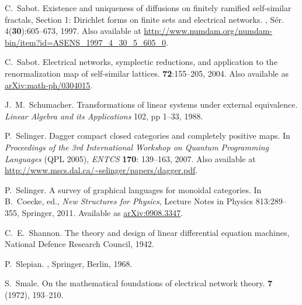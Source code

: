 \begin{thebibliography}{RSW00}
    C.\ Sabot.
    \newblock Existence and uniqueness of diffusions on
    finitely ramified self-similar fractals, Section 1: Dirichlet forms on
    finite sets and electrical networks.
    , S\'er. 4({\bf 30}):605--673, 1997.
    \newblock Also available at
    \href{http://www.numdam.org/numdam-bin/item?id=ASENS_1997_4_30_5_605_0}{http://www.numdam.org/numdam-bin/item?id=ASENS\_1997\_4\_30\_5\_605\_0}.

    C.\ Sabot.
    \newblock Electrical networks, symplectic reductions, and
    application to the renormalization map of self-similar lattices.
     {\bf 72}:155--205, 2004.
    \newblock Also available as
    \href{http://arxiv.org/abs/math-ph/0304015}{arXiv:math-ph/0304015}.

    J.\ M.\ Schumacher.
    \newblock Transformations of linear systems under
    external equivalence.
    \newblock \emph{Linear Algebra and its Applications} 102,
    pp 1--33, 1988.


    P.\ Selinger.
    \newblock Dagger compact closed categories and completely
    positive maps.
    \newblock In {\sl Proceedings of the 3rd International Workshop on
    Quantum Programming Languages} (QPL 2005), {\sl ENTCS} {\bf 170}:
    139--163, 2007.
    \newblock Also available at
    \href{http://www.mscs.dal.ca/~selinger/papers/dagger.pdf}{http://www.mscs.dal.ca/\~{}selinger/papers/dagger.pdf}.

    P.\ Selinger.
    \newblock A survey of graphical languages
    for monoidal categories.
    \newblock In B.\ Coecke, ed., \emph{New Structures for
    Physics}, Lecture Notes in Physics 813:289--355, Springer, 2011.
    \newblock Available
    as \href{http://arxiv.org/abs/0908.3347}{arXiv:0908.3347}.

    C.\ E.\ Shannon.
    \newblock The theory and design of linear differential equation machines, National Defence Research Council, 1942.


    P.\ Slepian.
    , Springer, Berlin, 1968. 

    S.\ Smale.
    \newblock On the mathematical foundations of electrical
    network theory.
     {\bf 7} (1972), 193--210. 


\end{thebibliography}
